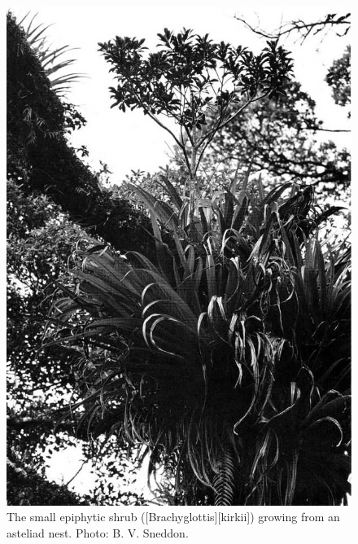 \begin{figure}[!t]
	\begin{minipage}[t]{\textwidth}
		\begin{minipage}[t]{(\textwidth-\fgap) * \real{0.497}}
			\centering
			\includegraphics[width=\textwidth]{graphics/figure44brachyglottis-kirkii.jpg}
			\caption[The small epiphytic shrub Kirk's daisy (\emph{Brachyglottis kirkii})]{The small epiphytic shrub  ([Brachyglottis][kirkii]) growing from an asteliad nest.
			Photo: B. V. Sneddon.}%
			\label{fig:44brachyglottis-kirkii}
		\end{minipage}\hspace{\fgap}%
		\begin{minipage}[t]{(\textwidth-\fgap) * \real{0.503}}

\end{minipage}
\end{minipage}
\end{figure}
